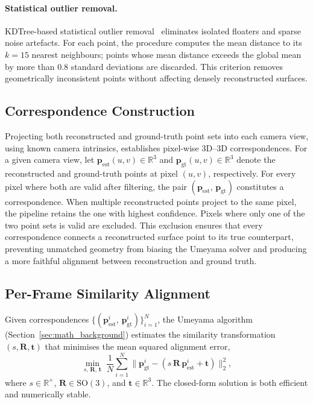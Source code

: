 \paragraph{Statistical outlier removal.}
KDTree-based statistical outlier removal~\cite{rusu2008statistical} eliminates isolated floaters and sparse noise artefacts. For each point, the procedure computes the mean distance to its $k = 15$ nearest neighbours; points whose mean distance exceeds the global mean by more than 0.8 standard deviations are discarded. This criterion removes geometrically inconsistent points without affecting densely reconstructed surfaces.

\subsection{Correspondence Construction}

Projecting both reconstructed and ground-truth point sets into each camera view,
using known camera intrinsics, establishes pixel-wise 3D--3D correspondences.
For a given camera view, let $\mathbf{p}_{\text{est}}(u,v) \in \mathbb{R}^3$ and
$\mathbf{p}_{\text{gt}}(u,v) \in \mathbb{R}^3$ denote the reconstructed and
ground-truth points at pixel $(u,v)$, respectively. For every pixel where both
are valid after filtering, the pair $(\mathbf{p}_{\text{est}},\,\mathbf{p}_{\text{gt}})$
constitutes a correspondence. When multiple reconstructed points project to the same
pixel, the pipeline retains the one with highest confidence. Pixels where only one
of the two point sets is valid are excluded. This exclusion ensures that every
correspondence connects a reconstructed surface point to its true counterpart,
preventing unmatched geometry from biasing the Umeyama solver and producing a
more faithful alignment between reconstruction and ground truth.

\subsection{Per-Frame Similarity Alignment}

Given correspondences $\{(\mathbf{p}_{\text{est}}^i,\,\mathbf{p}_{\text{gt}}^i)\}_{i=1}^{N}$,
the Umeyama algorithm (Section~\ref{sec:math_background}) estimates the similarity transformation
$(s, \mathbf{R}, \mathbf{t})$ that minimises the mean squared alignment error,
\begin{equation}
    \min_{s,\,\mathbf{R},\,\mathbf{t}}\;
    \frac{1}{N}\sum_{i=1}^{N}
    \bigl\|\mathbf{p}_{\text{gt}}^i - (s\,\mathbf{R}\,\mathbf{p}_{\text{est}}^i + \mathbf{t})\bigr\|_2^2,
\end{equation}
where $s \in \mathbb{R}^+$, $\mathbf{R} \in \mathrm{SO}(3)$, and
$\mathbf{t} \in \mathbb{R}^3$. The closed-form solution is both efficient and numerically
stable.

